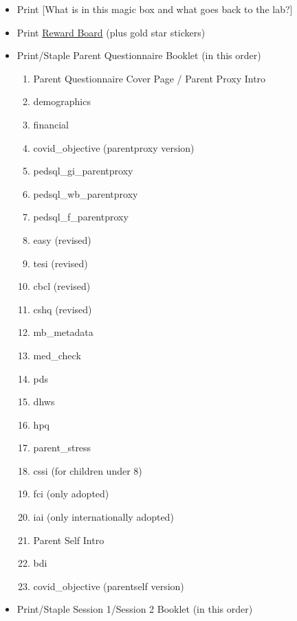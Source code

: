 \documentclass[]{book}
\providecommand{\tightlist}{%
  \setlength{\itemsep}{0pt}\setlength{\parskip}{0pt}}
\begin{document}
\begin{itemize}
\tightlist
\item
  Print {[}What is in this magic box and what goes back to the lab?{]}
\item
  Print \href{https://ucla.app.box.com/file/668504120930}{Reward Board} (plus gold star stickers)
\item
  Print/Staple Parent Questionnaire Booklet (in this order)

  \begin{enumerate}
  \def\labelenumi{\arabic{enumi}.}
  \tightlist
  \item
    Parent Questionnaire Cover Page / Parent Proxy Intro
  \item
    demographics
  \item
    financial
  \item
    covid\_objective (parentproxy version)
  \item
    pedsql\_gi\_parentproxy
  \item
    pedsql\_wb\_parentproxy
  \item
    pedsql\_f\_parentproxy
  \item
    easy (revised)
  \item
    tesi (revised)
  \item
    cbcl (revised)
  \item
    cshq (revised)
  \item
    mb\_metadata
  \item
    med\_check
  \item
    pds
  \item
    dhws
  \item
    hpq
  \item
    parent\_stress
  \item
    cssi (for children under 8)
  \item
    fci (only adopted)
  \item
    iai (only internationally adopted)
  \item
    Parent Self Intro
  \item
    bdi
  \item
    covid\_objective (parentself version)
  \end{enumerate}
\item
  Print/Staple Session 1/Session 2 Booklet (in this order)


\end{itemize}
\end{document}
